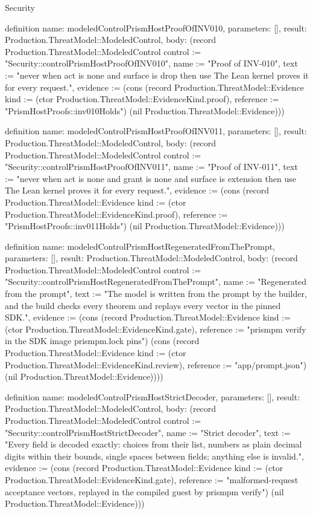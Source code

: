 \begin{lexlean}{Security}
\begin{semanticmodule}
definition{
  name: modeledControlPrismHostProofOfINV010,
  parameters: [],
  result: Production.ThreatModel::ModeledControl,
  body: (record Production.ThreatModel::ModeledControl {control := "Security::controlPrismHostProofOfINV010", name := "Proof of INV-010", text := "never when act is none and surface is drop then use The Lean kernel proves it for every request.", evidence := (cons (record Production.ThreatModel::Evidence {kind := (ctor Production.ThreatModel::EvidenceKind.proof), reference := "PrismHostProofs::inv010Holds"}) (nil Production.ThreatModel::Evidence))})
}

definition{
  name: modeledControlPrismHostProofOfINV011,
  parameters: [],
  result: Production.ThreatModel::ModeledControl,
  body: (record Production.ThreatModel::ModeledControl {control := "Security::controlPrismHostProofOfINV011", name := "Proof of INV-011", text := "never when act is none and grant is none and surface is extension then use The Lean kernel proves it for every request.", evidence := (cons (record Production.ThreatModel::Evidence {kind := (ctor Production.ThreatModel::EvidenceKind.proof), reference := "PrismHostProofs::inv011Holds"}) (nil Production.ThreatModel::Evidence))})
}

definition{
  name: modeledControlPrismHostRegeneratedFromThePrompt,
  parameters: [],
  result: Production.ThreatModel::ModeledControl,
  body: (record Production.ThreatModel::ModeledControl {control := "Security::controlPrismHostRegeneratedFromThePrompt", name := "Regenerated from the prompt", text := "The model is written from the prompt by the builder, and the build checks every theorem and replays every vector in the pinned SDK.", evidence := (cons (record Production.ThreatModel::Evidence {kind := (ctor Production.ThreatModel::EvidenceKind.gate), reference := "prismpm verify in the SDK image prismpm.lock pins"}) (cons (record Production.ThreatModel::Evidence {kind := (ctor Production.ThreatModel::EvidenceKind.review), reference := "app/prompt.json"}) (nil Production.ThreatModel::Evidence)))})
}

definition{
  name: modeledControlPrismHostStrictDecoder,
  parameters: [],
  result: Production.ThreatModel::ModeledControl,
  body: (record Production.ThreatModel::ModeledControl {control := "Security::controlPrismHostStrictDecoder", name := "Strict decoder", text := "Every field is decoded exactly: choices from their list, numbers as plain decimal digits within their bounds, single spaces between fields; anything else is invalid.", evidence := (cons (record Production.ThreatModel::Evidence {kind := (ctor Production.ThreatModel::EvidenceKind.gate), reference := "malformed-request acceptance vectors, replayed in the compiled guest by prismpm verify"}) (nil Production.ThreatModel::Evidence))})
}


\end{semanticmodule}
\end{lexlean}
